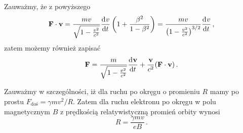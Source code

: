 \documentclass[../main.tex]{subfiles}
\begin{document}
Zauważmy, że z powyższego
\begin{equation*}
    \mathbf{F}\cdot\mathbf{v}=\frac{mv}{\sqrt{1-\frac{v^2}{c^2}}}\dv[]{v}{t}\left(1+\frac{\beta^2}{1-\beta^2}\right)=\frac{mv}{\left(1-\frac{v^2}{c^2}\right)^{3/2}}\dv[]{v}{t}\,,
\end{equation*}
zatem możemy również zapisać
\begin{equation*}
    \mathbf{F}=\frac{m}{\sqrt{1-\frac{v^2}{c^2}}}\dv[]{\mathbf{v}}{t}+\frac{\mathbf{v}}{c^2}(\mathbf{F}\cdot\mathbf{v})\,.
\end{equation*}
\noindent{}
\medskip

Zauważmy w szczególności, iż dla ruchu po okręgu o promieniu \(R\) mamy po prostu
\(F_\text{doś}=\gamma mv^2/R\). Zatem dla ruchu elektronu po okręgu w polu magnetycznym \(B\) z
prędkością relatywistyczną promień orbity wynosi
\begin{equation*}
    R=\frac{\gamma mv}{eB}\,.
\end{equation*}
\medskip
\end{document}
